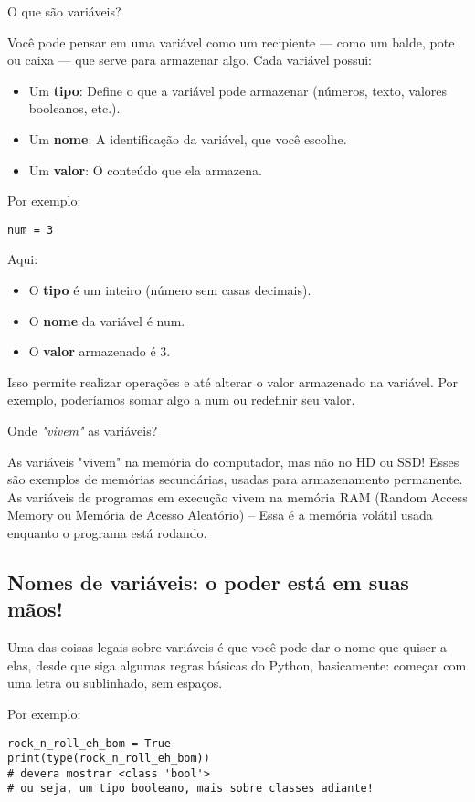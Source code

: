 \documentclass[12pt]{book}
\begin{document}
	O que são variáveis?
	
	Você pode pensar em uma variável como um recipiente — como um balde, pote ou caixa — que serve para armazenar algo. Cada variável possui:
	
	\begin{itemize}
	\item Um \textbf{tipo}: Define o que a variável pode armazenar (números, texto, valores booleanos, etc.).
	\item Um \textbf{nome}: A identificação da variável, que você escolhe.
	\item Um \textbf{valor}: O conteúdo que ela armazena.
	\end{itemize}
	Por exemplo: 
	\begin{lstlisting}[caption={código simples}]
num = 3\end{lstlisting}
	
	Aqui:
	
	\begin{itemize}
		\item O \textbf{tipo} é um inteiro (número sem casas decimais).
		\item O \textbf{nome} da variável é num.
		\item O \textbf{valor} armazenado é 3.
	\end{itemize}
	
	
	Isso permite realizar operações e até alterar o valor armazenado na variável. Por exemplo, poderíamos somar algo a num ou redefinir seu valor.
	
	Onde \textit{"vivem"} as variáveis?
	
	As variáveis "vivem" na memória do computador, mas não no HD ou SSD! Esses são exemplos de memórias secundárias, usadas para armazenamento permanente. As variáveis de programas em execução vivem na memória RAM (Random Access Memory ou Memória de Acesso Aleatório) -- Essa é a memória volátil usada enquanto o programa está rodando.
	
	\subsection{Nomes de variáveis: o poder está em suas mãos!}
	
	Uma das coisas legais sobre variáveis é que você pode dar o nome que quiser a elas, desde que siga algumas regras básicas do Python, basicamente: começar com uma letra ou sublinhado, sem espaços.
	
	Por exemplo:
	
	\begin{lstlisting}[caption={exemplo de variável}] 
rock_n_roll_eh_bom = True
print(type(rock_n_roll_eh_bom))
# devera mostrar <class 'bool'>
# ou seja, um tipo booleano, mais sobre classes adiante!
\end{lstlisting}
	
\end{document}
